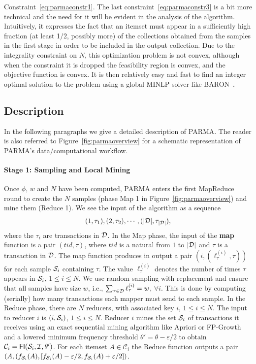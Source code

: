Constraint~\eqref{eq:parmaconstr1}. The last constraint~\eqref{eq:parmaconstr3} is a bit
more technical and the need for it will be evident in the analysis of the
algorithm. Intuitively, it expresses the fact that an itemset must appear in a
sufficiently high fraction (at least 1/2, possibly more) of the collections obtained from the samples in the
first stage in order to be included in the output collection. Due to the integrality constraint on
$N$, this optimization problem is not convex, although when the constraint it is
dropped the feasibility region is convex, and the objective function is convex.
It is then relatively easy and fast to find an integer optimal solution to the
problem using a global MINLP solver like BARON~\citep{baron}. 


\subsection{Description}
In the following paragraphs we give a detailed description of PARMA. The reader
is also referred to Figure~\ref{fig:parmaoverview} for a schematic representation of
PARMA's data/computational workflow.

\paragraph*{Stage 1: Sampling and Local Mining} Once $\phi$, $w$
and $N$ have been computed, PARMA enters the first MapReduce round to create
the $N$ samples (phase Map 1 in Figure~\ref{fig:parmaoverview}) and mine them (Reduce 1).
We see the input of the algorithm as a sequence
\[
(1,\tau_1),(2,\tau_2),\cdots,(|{\cal D}|,\tau_{|{\cal D}|}),\]
where the $\tau_i$ are transactions in ${\cal D}$.
In the Map phase, the input of the {\bf map} function is a pair $(tid, \tau)$, where
$tid$ is a natural from $1$ to $|{\cal D}|$ and $\tau$ is a transaction in ${\cal D}$. The
map function produces in output a pair $(i,(\ell^{(i)}_\tau,\tau))$ for each
sample ${\cal S}_i$ containing $\tau$. The value $\ell^{(i)}_\tau$ denotes the
number of times $\tau$ appears in ${\cal S}_i$, $1\le i \le N$. We use random sampling
with replacement and ensure that all samples have size $w$, i.e.,
$\sum_{\tau\in{\cal D}}\ell^{(i)}_\tau=w$, $\forall i$. This is done by computing
(serially) how many transactions each mapper must send to each sample. In the
Reduce phase, there are $N$ reducers, with associated key $i$, $1\le i \le N$.
The input to reducer $i$ is $(i,{\cal S}_i)$, $1\le i\le N$. Reducer $i$ mines the
set ${\cal S}_i$ of transactions it receives using an exact sequential mining
algorithm like Apriori or FP-Growth and a lowered minimum frequency threshold
$\theta'=\theta-\varepsilon/2$ to obtain
$\mathcal{C}_i=\mathsf{FI}({\cal S}_i,{\cal I},\theta')$. For each itemset $A\in\mathcal{C}_i$
the Reduce function outputs a pair $(A,
(f_{{\cal S}_i}(A),[f_{{\cal S}_i}(A)-\varepsilon/2,f_{{\cal S}_i}(A)+\varepsilon/2])$.

